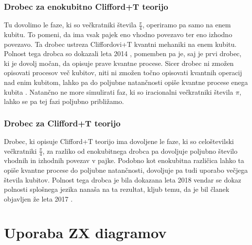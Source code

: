 \documentclass[mat1]{fmfdelo}
\begin{document}
\subsubsection{Drobec za enokubitno Clifford+T teorijo}
Tu dovolimo le faze, ki so večkratniki števila \(\frac\pi4\), operiramo pa samo na enem kubitu. To pomeni, da ima vsak pajek eno vhodno povezavo ter eno izhodno povezavo. Ta drobec ustreza Cliffordovi+T kvantni mehaniki na enem kubitu. Polnost tega drobca so dokazali leta 2014 \cite{backens2014zx}, pomemben pa je, saj je prvi drobec, ki je dovolj močan, da opisuje prave kvantne procese. Sicer drobec ni zmožen opisovati procesov več kubitov, niti ni zmožen točno opisovati kvantnih operacij nad enim kubitom, lahko pa do poljubne natančnosti opiše kvantne procese enega kubita \cite{814621}. Natančno ne more simulirati faz, ki so iracionalni večkratniki števila \(\pi\), lahko se pa tej fazi poljubno približamo.
\subsubsection{Drobec za Clifford+T teorijo}
Drobec, ki opisuje Clifford+T teorijo ima dovoljene le faze, ki so celoštevilski večkratniki \(\frac\pi4\), za razliko od enokubitnega drobca pa dovoljuje poljubno število vhodnih in izhodnih povezav v pajke. Podobno kot enokubitna različica lahko ta opiše kvantne procese do poljubne natančnosti, dovoljuje pa tudi uporabo večjega števila kubitov. Polnost tega drobca je bila dokazana leta 2018 \cite{SimonCompleteness} vendar se dokaz polnosti splošnega jezika nanaša na ta rezultat, kljub temu, da je bil članek objavljen že leta 2017 \cite{kangfengng}.
\section{Uporaba ZX diagramov}
\end{document}

